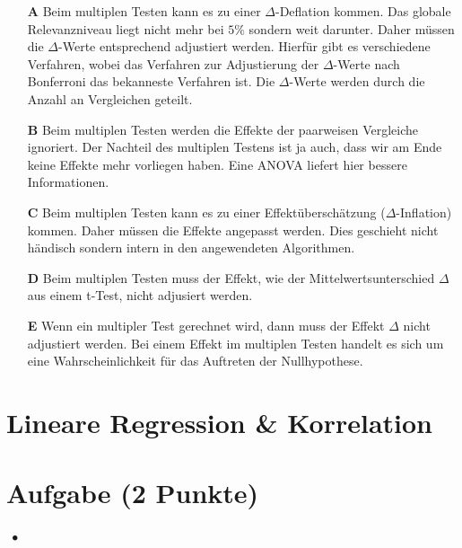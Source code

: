 \documentclass[a4paper, 9pt]{scrartcl}\usepackage[]{graphicx}\usepackage[]{xcolor}
\begin{document}
\begin{enumerate}
\item [\textbf{A} \msquare] Beim multiplen Testen kann es zu einer $\Delta$-Deflation kommen. Das globale Relevanzniveau liegt nicht mehr bei $5\%$ sondern weit darunter. Daher müssen die $\Delta$-Werte entsprechend adjustiert werden. Hierfür gibt es verschiedene Verfahren, wobei das Verfahren zur Adjustierung der $\Delta$-Werte nach Bonferroni das bekanneste Verfahren ist. Die $\Delta$-Werte werden durch die Anzahl an Vergleichen geteilt.
\item [\textbf{B} \msquare] Beim multiplen Testen werden die Effekte der paarweisen Vergleiche ignoriert. Der Nachteil des multiplen Testens ist ja auch, dass wir am Ende keine Effekte mehr vorliegen haben. Eine ANOVA liefert hier bessere Informationen.
\item [\textbf{C} \msquare] Beim multiplen Testen kann es zu einer Effektüberschätzung ($\Delta$-Inflation) kommen. Daher müssen die Effekte angepasst werden. Dies geschieht nicht händisch sondern intern in den angewendeten Algorithmen.
\item [\textbf{D} \msquare] Beim multiplen Testen muss der Effekt, wie der Mittelwertsunterschied $\Delta$ aus einem t-Test, nicht adjusiert werden.
\item [\textbf{E} \msquare] Wenn ein multipler Test gerechnet wird, dann muss der Effekt $\Delta$ nicht adjustiert werden. Bei einem Effekt im multiplen Testen handelt es sich um eine Wahrscheinlichkeit für das Auftreten der Nullhypothese.
\end{enumerate}
\section*{Lineare Regression \& Korrelation}

\section{Aufgabe \hfill (2 Punkte)}

\ifcollection
\begin{flushright}
\tiny\vspace{-2Ex}
\textbf{\examinhaltstart}
\exammodulestatversuch $\;\bullet$
\exammodulebiostat
\vspace{-1Ex}
\end{flushright}
\fi
\end{document}
